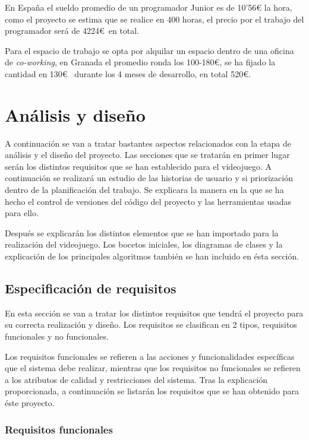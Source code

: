 En España el sueldo promedio de un programador Junior es de 10'56\euro  \cite{SueldoProgramador} la hora, como el proyecto se estima que se realice en 400 horas, el precio por el trabajo del programador será de 4224\euro~en total.

Para el espacio de trabajo se opta por alquilar un espacio dentro de una oficina de \textit{co-working}, en Granada el promedio ronda los 100-180\euro \cite{OficinaCoworking}, se ha fijado la cantidad en 130\euro~  durante los 4 meses de desarrollo, en total 520\euro.

\section{Análisis y diseño}
\label{sec:analisis}

A continuación se van a tratar bastantes aspectos relacionados con la etapa de análisis y el diseño del proyecto. Las secciones que se tratarán en primer lugar serán los distintos requisitos que se han establecido para el videojuego. A continuación se realizará un estudio de las historias de usuario y si priorización dentro de la planificación del trabajo. Se explicara la manera en la que se ha hecho el control de versiones del código del proyecto y las herramientas usadas para ello. 

Después se explicarán los distintos elementos que se han importado para la realización del videojuego. Los bocetos iniciales, los diagramas de clases y la explicación de los principales algoritmos también se han incluido en ésta sección.

\subsection{Especificación de requisitos}

En esta sección se van a tratar los distintos requisitos que tendrá el proyecto para su correcta realización y diseño. Los requisitos se clasifican en 2 tipos, requisitos funcionales y no funcionales. 

Los requisitos funcionales se refieren a las acciones y funcionalidades específicas que el sistema debe realizar, mientras que los requisitos no funcionales se refieren a los atributos de calidad y restricciones del sistema. Tras la explicación proporcionada, a continuación se listarán los requisitos que se han obtenido para éste proyecto.

\subsubsection{Requisitos funcionales}

